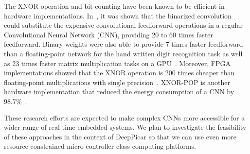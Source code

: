 The XNOR operation and bit counting have been known to be efficient in
hardware implementations. In~\cite{rastegari2016xnor}, it was shown
that the binarized convolution could substitute the expensive
convolutional feedforward operations in a regular Convolutional Neural
Network (CNN), %
providing 20 to 60 times faster feedforward. Binary weights were also
able to provide 7 times faster feedforward than a floating-point
network for the hand written digit recognition task as well as 23
times faster matrix multiplication tasks on a
GPU~\cite{hubara2016binarized}.
Moreover, FPGA implementations showed that the XNOR operation is 200
times cheaper than floating-point multiplications with 
single precision~\cite{beauchamp2006embedded,govindu2004analysis}.
XNOR-POP is another hardware implementation that reduced
the energy consumption of a CNN by 98.7\%~\cite{jiang2017xnor}.

These research efforts are expected to make complex CNNs more
accessible for a wider range of real-time embedded systems. We plan to
investigate the feasibility of these approaches in the context of
DeepPicar so that we can use even more resource constrained
micro-controller class computing platforms.

  

